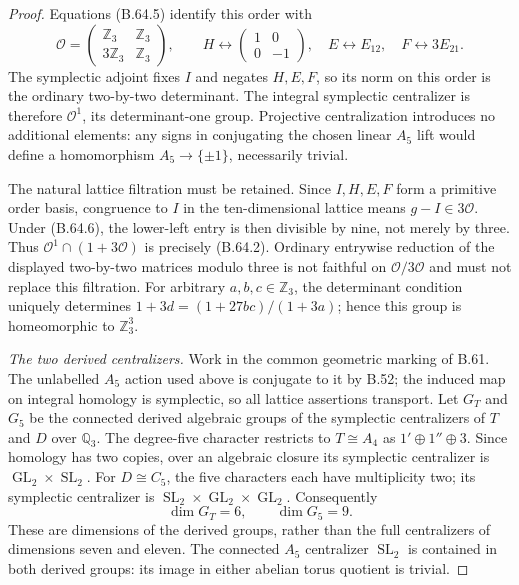 \begin{proof}
Equations (B.64.5) identify this order with
\[
 \mathcal O=
 \begin{pmatrix}\mathbb Z_3&\mathbb Z_3\\
                 3\mathbb Z_3&\mathbb Z_3\end{pmatrix},
 \qquad
 H\longleftrightarrow\begin{pmatrix}1&0\\0&-1\end{pmatrix},
 \quad E\longleftrightarrow E_{12},
 \quad F\longleftrightarrow3E_{21}.                         \tag{B.64.6}
\]
The symplectic adjoint fixes $I$ and negates $H,E,F$,
so its norm on this order is the ordinary two-by-two
determinant.  The integral symplectic centralizer is
therefore $\mathcal O^1$, its determinant-one group.
Projective centralization introduces no additional
elements: any signs in conjugating the chosen linear
$A_5$ lift would define a homomorphism
$A_5\to\{\pm1\}$, necessarily trivial.

The natural lattice filtration must be retained.
Since $I,H,E,F$ form a primitive order basis,
congruence to $I$ in the ten-dimensional lattice
means $g-I\in3\mathcal O$.
Under (B.64.6), the lower-left entry is then divisible
by nine, not merely by three.
Thus $\mathcal O^1\cap(1+3\mathcal O)$ is precisely
(B.64.2).  Ordinary entrywise reduction of the displayed
two-by-two matrices modulo three is not faithful on
$\mathcal O/3\mathcal O$ and must not replace this
filtration.
For arbitrary $a,b,c\in\mathbb Z_3$, the determinant
condition uniquely determines
$1+3d=(1+27bc)/(1+3a)$; hence this group is homeomorphic
to $\mathbb Z_3^3$.

\emph{The two derived centralizers.}
Work in the common geometric marking of B.61.
The unlabelled $A_5$ action used above is conjugate to
it by B.52; the induced map on integral homology is
symplectic, so all lattice assertions transport.
Let $G_T$ and $G_5$ be the connected derived algebraic
groups of the symplectic centralizers of $T$ and $D$
over $\mathbb Q_3$.
The degree-five character restricts to $T\cong A_4$
as $1'\oplus1''\oplus3$.
Since homology has two copies, over an algebraic
closure its symplectic centralizer is
$\operatorname{GL}_2\times\operatorname{SL}_2$.
For $D\cong C_5$, the five characters each have
multiplicity two; its symplectic centralizer is
$\operatorname{SL}_2\times\operatorname{GL}_2
                         \times\operatorname{GL}_2$.
Consequently
\[
                    \dim G_T=6,\qquad \dim G_5=9.           \tag{B.64.7}
\]
These are dimensions of the derived groups, rather
than the full centralizers of dimensions seven and eleven.
The connected $A_5$ centralizer $\operatorname{SL}_2$
is contained in both derived groups: its image in
either abelian torus quotient is trivial.


\end{proof}
